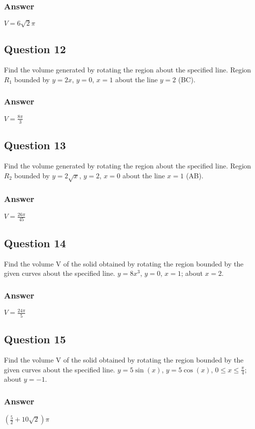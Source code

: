 \documentclass{article}
\begin{document}
\subsubsection*{Answer}
$ V = 6\sqrt{2}\pi $

\subsection*{Question 12}
Find the volume generated by rotating the region about the specified line. Region $R_1$ bounded by $y=2x$, $y=0$, $x=1$ about the line $y=2$ (BC).
\subsubsection*{Answer}
$ V = \frac{8\pi}{3} $

\subsection*{Question 13}
Find the volume generated by rotating the region about the specified line. Region $R_2$ bounded by $y=2\sqrt{x}$, $y=2$, $x=0$ about the line $x=1$ (AB).
\subsubsection*{Answer}
$ V = \frac{26\pi}{45} $

\subsection*{Question 14}
Find the volume V of the solid obtained by rotating the region bounded by the given curves about the specified line. $y=8x^3$, $y=0$, $x=1$; about $x=2$.
\subsubsection*{Answer}
$ V = \frac{24\pi}{5} $

\subsection*{Question 15}
Find the volume V of the solid obtained by rotating the region bounded by the given curves about the specified line. $y=5\sin(x)$, $y=5\cos(x)$, $0 \le x \le \frac{\pi}{4}$; about $y=-1$.
\subsubsection*{Answer}
$ (\frac{5}{2} + 10\sqrt{2})\pi $
\end{document}
